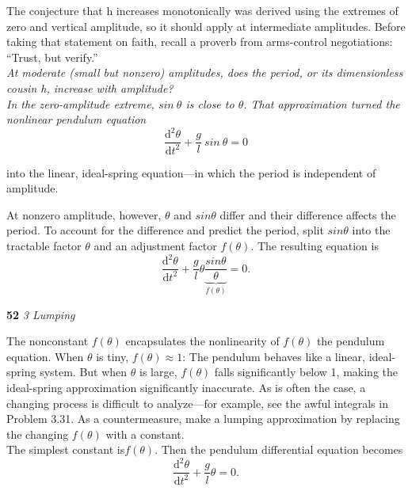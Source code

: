 \documentclass[a4paper, 11pt]{book}
\begin{document}
The conjecture that h increases monotonically was derived using the extremes
of zero and vertical amplitude, so it should apply at intermediate
amplitudes. Before taking that statement on faith, recall a proverb from
arms-control negotiations: “Trust, but verify.”\\

\it{At moderate (small but nonzero) amplitudes, does the period, or its dimensionless
cousin h, increase with amplitude?}\\

\rm In the zero-amplitude extreme, $sin~\theta$ is close to $\theta$. That approximation
turned the nonlinear pendulum equation
\begin{equation}
\frac{\mathrm{d}^2\theta }{\mathrm{d} t^2}+\frac{g}{l}~sin~\theta=0
\end{equation}

into the linear, ideal-spring equation—in which the period is independent
of amplitude.
\vspace{6pt}

At nonzero amplitude, however, $\theta$ and $sin \theta$ differ and their difference
affects the period. To account for the difference and predict the period,
split $sin \theta$ into the tractable factor $\theta$ and an adjustment factor $f(\theta)$. The resulting equation is
\begin{equation}
\frac{\mathrm{d}^2\theta }{\mathrm{d} t^2}+\frac{g}{l}\theta\underbrace{\frac{sin \theta}{\theta}}_{f(\theta)}=0.
\end{equation}

\newpage
\large\textbf{52} \hfill \textit{3 Lumping} \\
\vspace{15pt}

The nonconstant $f(\theta)$ encapsulates the nonlinearity of $f(\theta)$
the pendulum equation. When $\theta$ is tiny, $f(\theta) ≈ 1$: The
pendulum behaves like a linear, ideal-spring system.
But when $\theta$ is large, $f(\theta)$ falls significantly below 1,
making the ideal-spring approximation significantly
inaccurate. As is often the case, a changing process is
difficult to analyze—for example, see the awful integrals in Problem 3.31.
As a countermeasure, make a lumping approximation by replacing the
changing $f(\theta)$ with a constant.\\

The simplest constant is$f(\theta)$. Then the pendulum differential equation becomes
\begin{equation}
\frac{\mathrm{d}^2\theta }{\mathrm{d} t^2}+\frac{g}{l}\theta=0.
\end{equation}\\
\end{document}
